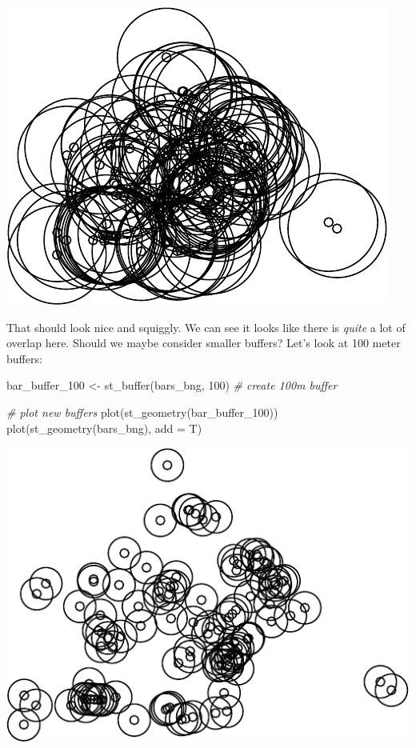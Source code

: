 \documentclass[
]{book}
\makeatletter
\newenvironment{Shaded}{\begin{snugshade}}{\end{snugshade}}
\newcommand{\AttributeTok}[1]{\textcolor[rgb]{0.61,0.61,0.61}{#1}}
\newcommand{\CommentTok}[1]{\textcolor[rgb]{0.37,0.37,0.37}{\textit{#1}}}
\newcommand{\DecValTok}[1]{\textcolor[rgb]{0.06,0.06,0.06}{#1}}
\newcommand{\FunctionTok}[1]{\textcolor[rgb]{0,0,0}{#1}}
\newcommand{\NormalTok}[1]{#1}
\newcommand{\OtherTok}[1]{\textcolor[rgb]{0.37,0.37,0.37}{#1}}
\newenvironment{kframe}{%
\medskip{}
\setlength{\fboxsep}{.8em}
 \def\at@end@of@kframe{}%
 \ifinner\ifhmode%
  \def\at@end@of@kframe{\end{minipage}}%
  \begin{minipage}{\columnwidth}%
 \fi\fi%
 \def\FrameCommand##1{\hskip\@totalleftmargin \hskip-\fboxsep
 \colorbox{shadecolor}{##1}\hskip-\fboxsep
     \hskip-\linewidth \hskip-\@totalleftmargin \hskip\columnwidth}%
 \MakeFramed {\advance\hsize-\width
   \@totalleftmargin\z@ \linewidth\hsize
   \@setminipage}}%
 {\par\unskip\endMakeFramed%
 \at@end@of@kframe}
\renewenvironment{Shaded}{\begin{kframe}}{\end{kframe}}
\makeatother
\begin{document}
\includegraphics{crime_mapping_files/figure-latex/plot_buffers-1.pdf}

That should look nice and squiggly. We can see it looks like there is \emph{quite} a lot of overlap here. Should we maybe consider smaller buffers? Let's look at 100 meter buffers:

\begin{Shaded}
\begin{Highlighting}[]
\NormalTok{bar\_buffer\_100 }\OtherTok{\textless{}{-}} \FunctionTok{st\_buffer}\NormalTok{(bars\_bng, }\DecValTok{100}\NormalTok{) }\CommentTok{\# create 100m buffer}

\CommentTok{\# plot new buffers}
\FunctionTok{plot}\NormalTok{(}\FunctionTok{st\_geometry}\NormalTok{(bar\_buffer\_100))}
\FunctionTok{plot}\NormalTok{(}\FunctionTok{st\_geometry}\NormalTok{(bars\_bng), }\AttributeTok{add =}\NormalTok{ T)}
\end{Highlighting}
\end{Shaded}

\includegraphics{crime_mapping_files/figure-latex/smaller_buffers-1.pdf}
\end{document}

